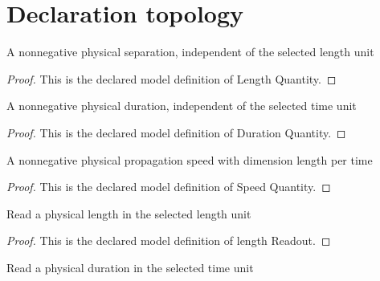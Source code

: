 \section{Declaration topology}
\begin{definition}
  \label{def:physics:phyx-mini-0286:phyxminiproblems-problemphyxmini0286-lengthquantity}
  A nonnegative physical separation, independent of the selected length unit
\end{definition}
\begin{proof}
  This is the declared model definition of Length Quantity.
\end{proof}
\begin{definition}
  \label{def:physics:phyx-mini-0286:phyxminiproblems-problemphyxmini0286-durationquantity}
  A nonnegative physical duration, independent of the selected time unit
\end{definition}
\begin{proof}
  This is the declared model definition of Duration Quantity.
\end{proof}
\begin{definition}
  \label{def:physics:phyx-mini-0286:phyxminiproblems-problemphyxmini0286-speedquantity}
  A nonnegative physical propagation speed with dimension length per time
\end{definition}
\begin{proof}
  This is the declared model definition of Speed Quantity.
\end{proof}
\begin{definition}
  \label{def:physics:phyx-mini-0286:phyxminiproblems-problemphyxmini0286-lengthreadout}
  Read a physical length in the selected length unit
\end{definition}
\begin{proof}
  This is the declared model definition of length Readout.
\end{proof}
\begin{definition}
  \label{def:physics:phyx-mini-0286:phyxminiproblems-problemphyxmini0286-durationreadout}
  Read a physical duration in the selected time unit
\end{definition}
